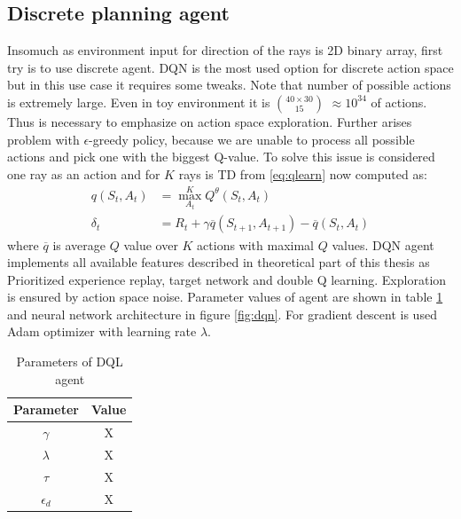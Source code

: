 \subsection{Discrete planning agent}
Insomuch as environment input for direction of the rays is 2D binary array, first try is to use discrete agent. DQN is the most used option for discrete action space but in this use case it requires some tweaks. Note that number of possible actions is extremely large. Even in toy environment it is $40\times30 \choose 15$ $\approx 10^{34}$ of actions. Thus is necessary to emphasize on action space exploration. Further arises problem with $\epsilon$-greedy policy, because we are unable to process all possible actions and pick one with the biggest Q-value. To solve this issue is considered one ray as an action and for $K$ rays is TD from \eqref{eq:qlearn} now computed as:
\begin{align}
q(S_t, A_t) &= \max\limits_{A_t}^K Q^\theta(S_t, A_t)\\
\delta_t &= R_t + \gamma \overline{q}(S_{t+1}, A_{t+1}) - \overline{q}(S_t, A_t)
\end{align}
where $\overline{q}$ is average $Q$ value over $K$ actions with maximal $Q$ values. DQN agent implements all available features described in theoretical part of this thesis as Prioritized experience replay, target network and double Q learning. Exploration is ensured by action space noise. Parameter values of agent are shown in table \ref{tab:dqlparam} and neural network architecture in figure \ref{fig:dqn}. For gradient descent is used Adam optimizer with learning rate $\lambda$.

\begin{table}[H]
  \centering
  \begin{tabular}{*{2}{c}}
    \toprule
    Parameter & Value \\
    \midrule
    $\gamma$ & X \\
    $\lambda$ & X \\
    $\tau$ & X \\
    $\epsilon_d$ & X \\
    \bottomrule
  \end{tabular}
  \caption{Parameters of DQL agent}
  \label{tab:dqlparam}
\end{table}
\pagebreak

